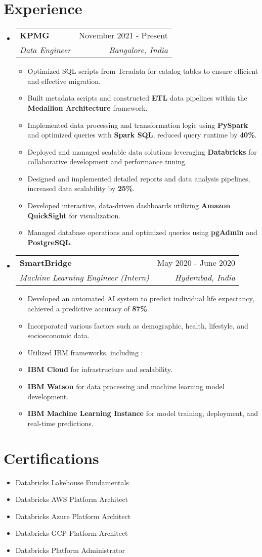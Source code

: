 \documentclass[letterpaper,11pt]{article}
\makeatletter
\newcommand{\resumeItem}[1]{
  \item\small{
    {#1 \vspace{-2pt}}
  }
}
\newcommand{\resumeSubheading}[4]{
  \vspace{-2pt}\item
    \begin{tabular*}{0.97\textwidth}[t]{l@{\extracolsep{\fill}}r}
      \textbf{#1} & #2 \\
      \textit{\small#3} & \textit{\small #4} \\
    \end{tabular*}\vspace{-7pt}
}
\newcommand{\resumeSubHeadingListStart}{\begin{itemize}[leftmargin=0.15in, label={}]}
\newcommand{\resumeSubHeadingListEnd}{\end{itemize}}
\newcommand{\resumeItemListStart}{\begin{itemize}}
\newcommand{\resumeItemListEnd}{\end{itemize}\vspace{-5pt}}
\makeatother
\begin{document}
\section{Experience}
  \resumeSubHeadingListStart
    \resumeSubheading
      {KPMG}{November 2021 - Present}
      {Data Engineer}{Bangalore, India}
      \resumeItemListStart
      \resumeItem{Optimized SQL scripts from Teradata for catalog tables to ensure efficient and effective migration.}
      \resumeItem{Built metadata scripts and constructed \textbf{ETL} data pipelines within the \textbf{Medallion Architecture} framework.}
      \resumeItem{Implemented data processing and transformation logic using \textbf{PySpark} and optimized queries with \textbf{Spark SQL}, reduced query runtime by \textbf{40\%}.}
      \resumeItem{Deployed and managed scalable data solutions leveraging \textbf{Databricks} for collaborative development and performance tuning.}
      \resumeItemListEnd

      \resumeItemListStart
      \resumeItem{Designed and implemented detailed reports and data analysis pipelines, increased data scalability by \textbf{25\%}.}
      \resumeItem{Developed interactive, data-driven dashboards utilizing \textbf{Amazon QuickSight} for visualization.}
      \resumeItem {Managed database operations and optimized queries using \textbf{pgAdmin} and \textbf{PostgreSQL}.}
      \resumeItemListEnd

    \resumeSubheading
      {SmartBridge}{May 2020 - June 2020}
      {Machine Learning Engineer (Intern)}{Hyderabad, India}
      \resumeItemListStart
      \resumeItem {Developed an automated AI system to predict individual life expectancy, achieved a predictive accuracy of \textbf{87\%}.}
      \resumeItem {Incorporated various factors such as demographic, health, lifestyle, and socioeconomic data.}
      \resumeItem {Utilized IBM frameworks, including :}
      \resumeItem{\textbf{IBM Cloud} for infrastructure and scalability.}
      \resumeItem{\textbf{IBM Watson} for data processing and machine learning model development.}
      \resumeItem{\textbf{IBM Machine Learning Instance} for model training, deployment, and real-time predictions.}
      \resumeItemListEnd
  \resumeSubHeadingListEnd

\section{Certifications}
    \resumeItemListStart
    \resumeItem {Databricks Lakehouse Fundamentals}
    \resumeItem {Databricks AWS Platform Architect}
    \resumeItem {Databricks Azure Platform Architect}
    \resumeItem {Databricks GCP Platform Architect}
    \resumeItem {Databricks Platform Administrator}
    \resumeSubHeadingListEnd
\end{document}
